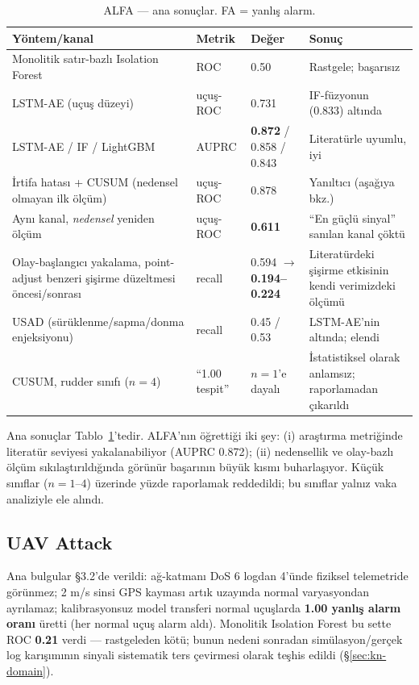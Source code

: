 \documentclass[11pt,a4paper]{article}
\begin{document}
\begin{table}[h]
\centering\small
\caption{ALFA --- ana sonuçlar. FA = yanlış alarm.}
\label{tab:alfa-sonuclar}
\begin{tabular}{p{5.2cm}p{3.4cm}p{2.6cm}p{3.4cm}}
\toprule
Yöntem/kanal & Metrik & Değer & Sonuç \\
\midrule
Monolitik satır-bazlı Isolation Forest & ROC & 0.50 & Rastgele; başarısız \\
LSTM-AE (uçuş düzeyi) & uçuş-ROC & 0.731 & IF-füzyonun (0.833) altında \\
LSTM-AE / IF / LightGBM & AUPRC & \textbf{0.872} / 0.858 / 0.843 &
Literatürle uyumlu, iyi \\
İrtifa hatası + CUSUM (nedensel olmayan ilk ölçüm) & uçuş-ROC & 0.878 &
Yanıltıcı (aşağıya bkz.) \\
Aynı kanal, \emph{nedensel} yeniden ölçüm & uçuş-ROC & \textbf{0.611} &
``En güçlü sinyal'' sanılan kanal çöktü \\
Olay-başlangıcı yakalama, point-adjust benzeri şişirme düzeltmesi öncesi/sonrası &
recall & 0.594 $\to$ \textbf{0.194--0.224} & Literatürdeki şişirme etkisinin
kendi verimizdeki ölçümü \\
USAD (sürüklenme/sapma/donma enjeksiyonu) & recall & 0.45 / 0.53 & LSTM-AE'nin
altında; elendi \\
CUSUM, rudder sınıfı ($n{=}4$) & ``1.00 tespit'' & $n{=}1$'e dayalı &
İstatistiksel olarak anlamsız; raporlamadan çıkarıldı \\
\bottomrule
\end{tabular}
\end{table}

Ana sonuçlar Tablo~\ref{tab:alfa-sonuclar}'tedir. ALFA'nın öğrettiği iki şey:
(i) araştırma metriğinde literatür seviyesi
yakalanabiliyor (AUPRC 0.872); (ii) nedensellik ve olay-bazlı ölçüm
sıkılaştırıldığında görünür başarının büyük kısmı buharlaşıyor. Küçük sınıflar
($n{=}1$--$4$) üzerinde yüzde raporlamak reddedildi; bu sınıflar yalnız vaka
analiziyle ele alındı.

\subsection{UAV Attack}

Ana bulgular \S3.2'de verildi: ağ-katmanı DoS 6 logdan 4'ünde fiziksel
telemetride görünmez; 2 m/s sinsi GPS kayması artık uzayında normal
varyasyondan ayrılamaz; kalibrasyonsuz model transferi normal uçuşlarda
\textbf{1.00 yanlış alarm oranı} üretti (her normal uçuş alarm aldı). Monolitik
Isolation Forest bu sette ROC \textbf{0.21} verdi --- rastgeleden kötü; bunun
nedeni sonradan simülasyon/gerçek log karışımının sinyali sistematik ters
çevirmesi olarak teşhis edildi (\S\ref{sec:kn-domain}).
\end{document}
